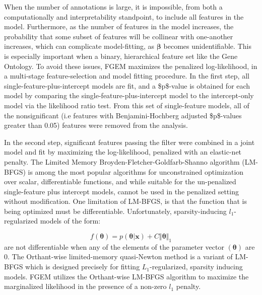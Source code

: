 When the number of annotations is large, it is impossible, from both a computationally and interpretability standpoint, to include all features in the model.
Furthermore, as the number of features in the model increases, the probability that some subset of features will be collinear with one-another increases,
which can complicate model-fitting, as \(\boldsymbol{\beta}\) becomes unidentifiable. This is especially important when a binary, hierarchical feature set
like the Gene Ontology.  To avoid these issues, FGEM maximizes the penalized log-likelihood, in a multi-stage feature-selection and model fitting procedure. In the first step, all
single-feature-plus-intercept models are fit, and a \$p\$-value is obtained for each model by comparing the single-feature-plus-intercept model to the intercept-only model via the
likelihood ratio test.  From this set of single-feature models, all of the nonsignificant (i.e features with Benjamini-Hochberg adjusted
\$p\$-values greater than 0.05) features were removed from the analysis.


In the second step, significant features passing the filter were combined in a joint model and fit by maximizing the log-likelihood, penalized with an elastic-net penalty.  The Limited Memory Broyden-Fletcher-Goldfarb-Shanno algorithm (LM-BFGS)\cite{LMBFGS} is among the most popular algorithms
for unconstrained optimization over scalar, differentiable functions, and while suitable for the un-penalized single-feature plus intercept models, cannot be used in the penalized setting without modification.  One limitation of LM-BFGS, is that the function that is being optimized must be differentiable.  Unfortunately, sparsity-inducing $l_{\text{1}}$-regularized models of the form:

$$f(\boldsymbol{\theta})=p(\boldsymbol{\theta} | \textbf{x}) + C \Vert \boldsymbol{\theta} \Vert_1$$ are not differentiable when any of the elements of the parameter vector $(\boldsymbol{\theta})$ are 0.  The Orthant-wise limited-memory quasi-Newton method is a variant of LM-BFGS which is designed precisely for fitting $L_1$-regularized, sparsity inducing models.  FGEM utilizes the Orthant-wise LM-BFGS algorithm to maximize the marginalized likelihood in the presence of a non-zero $l_{\text{1}}$ penalty.


